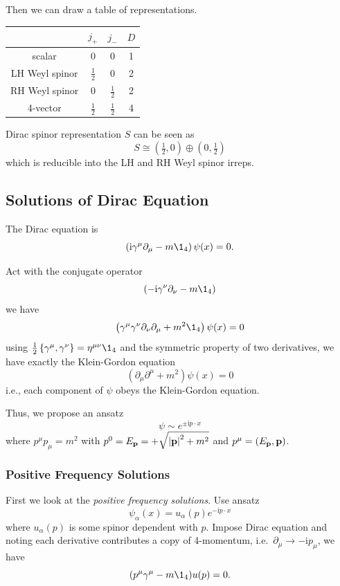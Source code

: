 \documentclass[a4paper,11pt]{article}
\begin{document}
	Then we can draw a table of representations.
	\begin{center}
		\begin{tabular}{c|ccc}
			\hline
			& $j_+$ & $j_-$ & $D$\\
			\hline
			scalar & 0 & 0 & 1\\
			LH Weyl spinor & $\frac{1}{2}$ & 0 & 2\\
			RH Weyl spinor & 0 & $\frac{1}{2}$ & 2\\
			4-vector & $\frac{1}{2}$ & $\frac{1}{2}$ & 4\\ 
			\hline 
		\end{tabular}
	\end{center}

	Dirac spinor representation $S$ can be seen as 
	\[
		S \cong \left( \tfrac{1}{2}, 0 \right) \oplus \left( 0, \tfrac{1}{2} \right)
	\]
	which is reducible into the LH and RH Weyl spinor irreps.

	\subsection{Solutions of Dirac Equation}

	The Dirac equation is 
	\[
		\left( \mathrm{i}\gamma^\mu \partial_\mu - m \1_4 \right) \psi(x) = 0.
	\]
	
	Act with the conjugate operator 
	\[
		\left( -\mathrm{i} \gamma^\nu \partial_\nu - m \1_4 \right)
	\]
	we have
	\[
		\left( \gamma^\mu \gamma^\nu \partial_\nu \partial_\mu + m^2 \1_4 \right) \psi(x) = 0
	\]
	using $\frac{1}{2}\left\{ \gamma^\mu, \gamma^\nu \right\} = \eta ^{\mu \nu}\1_4$ and the symmetric property of two derivatives, we have exactly the Klein-Gordon equation
	\[
		(\partial_\mu \partial^\mu + m^2) \psi(x) = 0
	\]
	i.e., each component of $\psi$ obeys the Klein-Gordon equation.

	Thus, we propose an ansatz 
	\[
		\psi \sim e ^{\pm \mathrm{i} p \cdot x}
	\]
	where $p^\mu p_\mu = m^2$ with $p^0 = E _{\vb p} = + \sqrt{\abs{\vb p}^2 + m^2}$ and $p^\mu = (E _{\vb p}, \vb p)$.
	
	\subsubsection{Positive Frequency Solutions}

	First we look at the \emph{positive frequency solutions}. Use ansatz
	\[
		\psi_\alpha(x) = u_\alpha (p) e ^{- \mathrm{i} p \cdot x}
	\]
	where $u_\alpha(p)$ is some spinor dependent with $p$. Impose Dirac equation and noting each derivative contributes a copy of 4-momentum, i.e.\ $\partial_\mu \to - \mathrm{i} p_\mu$, we have
	\[
		(p^\mu \gamma^\mu - m \1_4) u (p) = 0.
	\]
	
\end{document}
